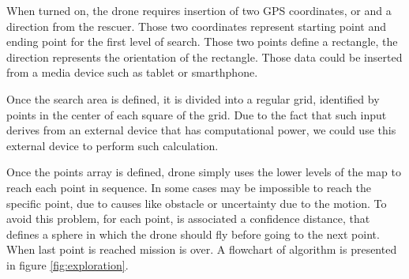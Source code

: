 \begin{figure}[p]
\end{figure}

When turned on, the drone requires insertion of two GPS coordinates, or  and a direction from the rescuer. Those two coordinates represent starting point and ending point for the first level of search. Those two points define a rectangle, the direction represents the orientation of the rectangle. Those data could be inserted from a media device such as tablet or smarthphone.

Once the search area is defined, it is divided into a regular grid, identified by points in the center of each square of the grid. Due to the fact that such input derives from an external device that has computational power, we could use this external device to perform such calculation.

Once the points array is defined, drone simply uses the lower levels of the map to reach each point in sequence. In some cases may be impossible to reach the specific point, due to causes like obstacle or uncertainty due to the motion. To avoid this problem, for each point, is associated a confidence distance, that defines a sphere in which the drone should fly before going to the next point. When last point is reached mission is over. A flowchart of algorithm is presented in figure \ref{fig:exploration}.

